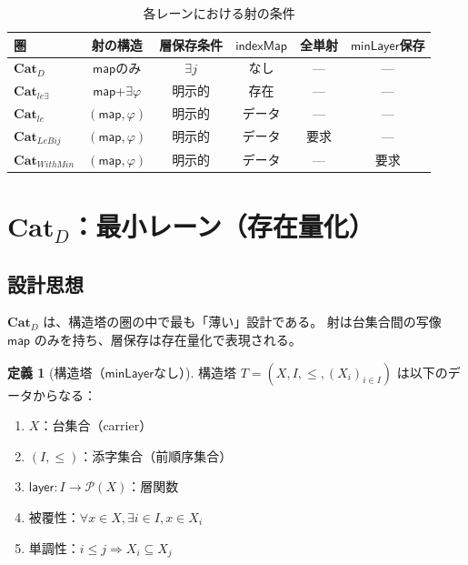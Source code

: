 \documentclass[a4paper,11pt]{ltjsarticle}
\theoremstyle{definition}
\newtheorem{definition}{定義}[section]
\theoremstyle{plain}
\newcommand{\CatD}{\mathbf{Cat}_D}
\newcommand{\Catle}{\mathbf{Cat}_{le}}
\newcommand{\CatleE}{\mathbf{Cat}_{le\exists}}
\newcommand{\CatLeBij}{\mathbf{Cat}_{LeBij}}
\newcommand{\CatWithMin}{\mathbf{Cat}_{WithMin}}
\newcommand{\minLayer}{\mathsf{minLayer}}
\newcommand{\indexMap}{\mathsf{indexMap}}
\newcommand{\layer}{\mathsf{layer}}
\begin{document}
\begin{table}[htbp]
\centering
\caption{各レーンにおける射の条件}
\label{tab:hom-conditions}
\begin{tabular}{lccccc}
\toprule
圏 & 射の構造 & 層保存条件 & $\indexMap$ & 全単射 & $\minLayer$保存 \\
\midrule
$\CatD$ & $\mathsf{map}$のみ & $\exists j$ & なし & --- & --- \\
$\CatleE$ & $\mathsf{map}$+$\exists\varphi$ & 明示的 & 存在 & --- & --- \\
$\Catle$ & $(\mathsf{map}, \varphi)$ & 明示的 & データ & --- & --- \\
$\CatLeBij$ & $(\mathsf{map}, \varphi)$ & 明示的 & データ & 要求 & --- \\
$\CatWithMin$ & $(\mathsf{map}, \varphi)$ & 明示的 & データ & --- & 要求 \\
\bottomrule
\end{tabular}
\end{table}

\section{$\CatD$：最小レーン（存在量化）}
\label{sec:cat-d}

\subsection{設計思想}

$\CatD$ は、構造塔の圏の中で最も「薄い」設計である。
射は台集合間の写像 $\mathsf{map}$ のみを持ち、層保存は存在量化で表現される。

\begin{definition}[構造塔（$\minLayer$なし）]
\label{def:structure-tower}
構造塔 $T = (X, I, \leq, (X_i)_{i \in I})$ は以下のデータからなる：
\begin{enumerate}
  \item $X$：台集合（carrier）
  \item $(I, \leq)$：添字集合（前順序集合）
  \item $\layer : I \to \mathcal{P}(X)$：層関数
  \item 被覆性：$\forall x \in X, \exists i \in I, x \in X_i$
  \item 単調性：$i \leq j \Rightarrow X_i \subseteq X_j$
\end{enumerate}
\end{definition}
\end{document}
